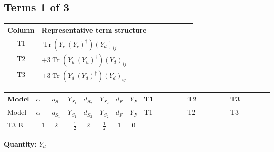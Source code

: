 \documentclass[8pt]{article}
\begin{document}
\begin{landscape}
\subsection*{Terms 1 of 3}
\begin{center}
\begin{tabular}{@{}c >{\raggedright\arraybackslash}p{0.82\linewidth}@{}}
\toprule
Column & Representative term structure \\
\midrule
T1 & \(\displaystyle \operatorname{Tr}\!\left({Y_e}\,\left({Y_e}\right)^{\dagger}\right) \left({Y_d}\right)_{ij}\) \\
\midrule
T2 & \(\displaystyle +3 \operatorname{Tr}\!\left({Y_u}\,\left({Y_u}\right)^{\dagger}\right) \left({Y_d}\right)_{ij}\) \\
\midrule
T3 & \(\displaystyle +3 \operatorname{Tr}\!\left({Y_d}\,\left({Y_d}\right)^{\dagger}\right) \left({Y_d}\right)_{ij}\) \\
\midrule
\bottomrule
\end{tabular}
\end{center}
\smallskip
\tiny
\begin{longtable}{@{}llcccccc >{\raggedright\arraybackslash}p{0.21\linewidth} >{\raggedright\arraybackslash}p{0.21\linewidth} >{\raggedright\arraybackslash}p{0.21\linewidth}@{}}
\toprule
Model & $\alpha$ & $d_{S_1}$ & $Y_{S_1}$ & $d_{S_2}$ & $Y_{S_2}$ & $d_F$ & $Y_F$ & T1 & T2 & T3 \\
\midrule
\endfirsthead
\toprule
Model & $\alpha$ & $d_{S_1}$ & $Y_{S_1}$ & $d_{S_2}$ & $Y_{S_2}$ & $d_F$ & $Y_F$ & T1 & T2 & T3 \\
\midrule
\endhead
T3-B & $-1$ & $2$ & $-\frac{1}{2}$ & $2$ & $\frac{1}{2}$ & $1$ & $0$ & \scriptsize\adjustbox{max width=\linewidth}{$\begin{gathered} \operatorname{Tr}\!\left({Y_e}\,\left({Y_e}\right)^{\dagger}\right) \left({Y_d}\right)_{ij}\end{gathered}$} & \scriptsize\adjustbox{max width=\linewidth}{$\begin{gathered} +3 \operatorname{Tr}\!\left({Y_u}\,\left({Y_u}\right)^{\dagger}\right) \left({Y_d}\right)_{ij}\end{gathered}$} & \scriptsize\adjustbox{max width=\linewidth}{$\begin{gathered} +3 \operatorname{Tr}\!\left({Y_d}\,\left({Y_d}\right)^{\dagger}\right) \left({Y_d}\right)_{ij}\end{gathered}$} \\
\midrule
\bottomrule
\end{longtable}
\clearpage
\noindent\textbf{Quantity: }$Y_d$\par\smallskip

\end{landscape}
\end{document}
